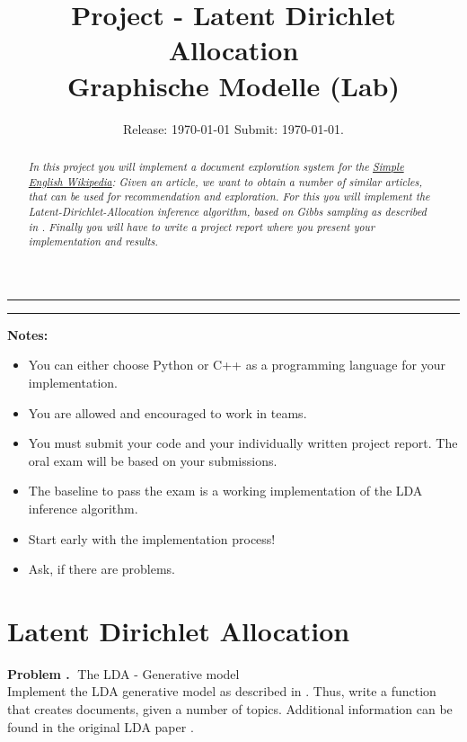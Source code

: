 \documentclass[10pt]{article}
\newcounter{problemCounter}
\newenvironment{problem}[1]
{
	\vspace{0.5cm}
	\refstepcounter{problemCounter}\label{#1}
	\noindent \textbf{Problem \theproblemCounter.$\;$}
}{}
\begin{document}
\title{ Project - Latent Dirichlet Allocation \\
	Graphische Modelle (Lab)}
\author{Release: \today \; Submit: \AdvanceDate[32]\today.\\}
\date{}
\maketitle

\hrule
\begin{abstract}
\itshape
In this project you will implement a document exploration system for the \href{https://simple.wikipedia.org/wiki/Main_Page}{Simple English Wikipedia}\cite{url:sew}: Given an article, we want to obtain a number of similar articles, that can be used for recommendation and exploration. For this you will implement the Latent-Dirichlet-Allocation inference algorithm, based on Gibbs sampling as described in \cite{heinrich:pefta}. Finally you will have to write a project report where you present your implementation and results. \\
\end{abstract}
\hrule

\bigskip
\bigskip
\textbf{Notes:}
\begin{itemize}
	\item You can either choose Python or C++ as a programming language for your implementation.
	\item You are allowed and encouraged to work in teams.
	\item You must submit your code and your individually written project report. The oral exam will be based on your submissions.
	\item The baseline to pass the exam is a working implementation of the LDA inference algorithm.
	\item Start early with the implementation process!
	\item Ask, if there are problems.
\end{itemize}

\section{Latent Dirichlet Allocation}
\begin{problem}
	TThe LDA - Generative model \\
	Implement the LDA generative model as described in \cite{heinrich:pefta}. Thus, write a function that creates documents, given a number of topics. Additional information can be found in the original LDA paper \cite{blei:lda}.
\end{problem}
\end{document}
